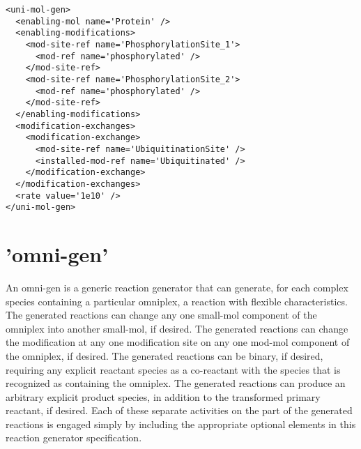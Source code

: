 \begin{lstlisting}[caption='A simple uni-mol-gen that represents a protein
  with two phosphorylation sites that is ubiquitinated']
<uni-mol-gen>
  <enabling-mol name='Protein' />
  <enabling-modifications>
    <mod-site-ref name='PhosphorylationSite_1'>
      <mod-ref name='phosphorylated' />
    </mod-site-ref>
    <mod-site-ref name='PhosphorylationSite_2'>
      <mod-ref name='phosphorylated' />
    </mod-site-ref>
  </enabling-modifications>
  <modification-exchanges>
    <modification-exchange>
      <mod-site-ref name='UbiquitinationSite' />
      <installed-mod-ref name='Ubiquitinated' />
    </modification-exchange>
  </modification-exchanges>
  <rate value='1e10' />
</uni-mol-gen>  
\end{lstlisting}

\section{'omni-gen'}

An omni-gen is a generic reaction generator that can generate, for
each complex species containing a particular omniplex, a reaction with
flexible characteristics. The generated reactions can change any one
small-mol component of the omniplex into another small-mol, if
desired. The generated reactions can change the modification at any
one modification site on any one mod-mol component of the omniplex, if
desired. The generated reactions can be binary, if desired, requiring
any explicit reactant species as a co-reactant with the species that
is recognized as containing the omniplex. The generated reactions can
produce an arbitrary explicit product species, in addition to the
transformed primary reactant, if desired. Each of these separate
activities on the part of the generated reactions is engaged simply by
including the appropriate optional elements in this reaction generator
specification. 


